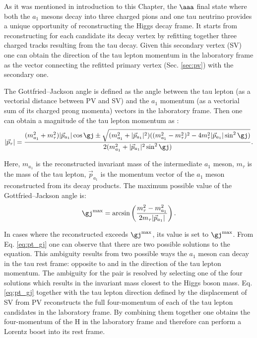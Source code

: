 As it was mentioned in introduction to this Chapter, the $\aaa$ final state where both the $a_1$ mesons decay into three charged pions and one tau neutrino provides a unique opportunity of reconstructing the Higgs decay frame. It starts from reconstructing for each \tauh candidate its decay vertex by refitting together three charged tracks resulting from the tau decay. Given this secondary vertex (SV) one can obtain the direction of the tau lepton momentum in the laboratory frame as the vector connecting the refitted primary vertex (Sec. \ref{sec:pv}) with the secondary one. 

The Gottfried–Jackson angle \gj is defined as the angle between the tau lepton (as a vectorial distance between PV and SV) and the $a_1$ momentum (as a vectorial sum of its charged prong momenta) vectors in the laboratory frame. Then one can obtain a magnitude of the tau lepton momentum as \cite{Cherepanov:2018npf}:
\begin{equation}\label{eq:pt_gj}
    |\vec{p}_\tau| = \dfrac{(m^2_{a_1} + m^2_\tau)|\vec{p}_{a_1}|\cos\gj \pm \sqrt{(m^2_{a_1}+|\vec{p}_{a_1}|^2)((m^2_{a_1} - m^2_\tau)^2 - 4m^2_\tau|\vec{p}_{a_1}|\sin^2\gj)}}{2(m^2_{a_1}+|\vec{p}_{a_1}|^2\sin^2\gj)}.
\end{equation}

Here, $m_{a_1}$ is the reconstructed invariant mass of the intermediate $a_1$ meson, $m_\tau$ is the mass of the tau lepton, $\vec{p}_{a_1}$ is the momentum vector of the $a_1$ meson reconstructed from its decay products. The maximum possible value of the Gottfried–Jackson angle is:
\begin{equation}
    \gj^\text{max} = \arcsin\left(\dfrac{m_\tau^2 - m_{a_1}^2}{2m_\tau|\vec{p}_{a_1}|}\right).
\end{equation}

In cases where the reconstructed \gj exceeds $\gj^\text{max}$, its value is set to  $\gj^\text{max}$. From Eq. \ref{eq:pt_gj} one can observe that there are two possible solutions to the equation. This ambiguity results from two possible ways the $a_1$ meson can decay in the tau rest frame: opposite to and in the direction of the tau lepton momentum. The ambiguity for the \aaa pair is resolved by selecting one of the four solutions which results in the invariant mass closest to the Higgs boson mass. Eq. \ref{eq:pt_gj} together with the tau lepton direction defined by the displacement of SV from PV reconstructs the full four-momentum of each of the tau lepton candidates in the laboratory frame. By combining them together one obtains the four-momentum of the H in the laboratory frame and therefore can perform a Lorentz boost into its rest frame.


